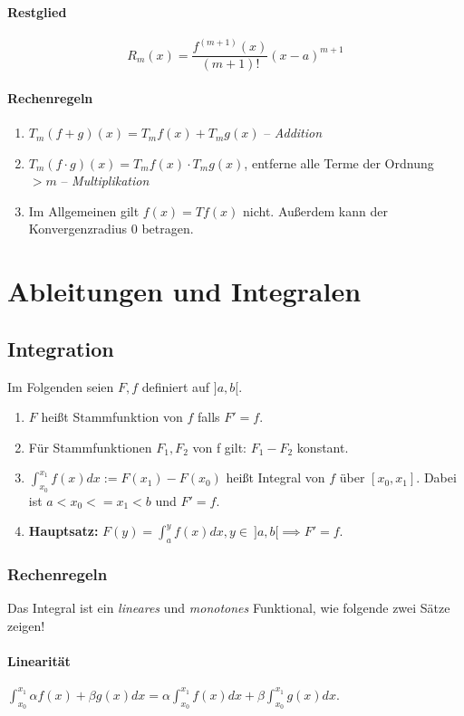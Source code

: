 \documentclass[a4paper, 9pt, DIV=24]{scrartcl}
\begin{document}
\paragraph{Restglied}

\[ R_{m}(x) = \frac{f^{(m+1)}(x)}{(m+1)!}(x-a)^{m+1} \]

\paragraph{Rechenregeln}
\begin{enumerate}[label={(}\arabic*{)}]
 \item $T_m(f+g)(x) = T_m f(x) + T_m g(x)$ -- \emph{Addition}
 \item $T_m(f\cdot g)(x) = T_m f(x) \cdot T_m g(x)$, entferne alle Terme der Ordnung $> m$ -- \emph{Multiplikation}
 \item Im Allgemeinen gilt $f(x) = T f(x)$ nicht. Außerdem kann der Konvergenzradius $0$ betragen.
\end{enumerate}

\clearpage
\section{Ableitungen und Integralen}

\subsection{Integration}
Im Folgenden seien $F, f$ definiert auf $]a,b[$.
\begin{enumerate}[label={(}\arabic*{)}]
 \item $F$ heißt Stammfunktion von $f$ falls $F' = f$.
 \item Für Stammfunktionen $F_1, F_2$ von f gilt: $F_1 - F_2$ konstant.
 \item $\int_{x_0}^{x_1}f(x)dx := F(x_1) - F(x_0)$ heißt Integral von $f$ über $[x_0, x_1]$.
   Dabei ist $a < x_0 <= x_1 < b$ und $F' = f$.
 \item \textbf{Hauptsatz:} $F(y) = \int_{a}^{y}f(x)dx, y \in\ ]a,b[ \implies F' = f.$
\end{enumerate}

\subsubsection{Rechenregeln}
Das Integral ist ein \emph{lineares} und \emph{monotones} Funktional, wie folgende zwei Sätze zeigen!
\paragraph{Linearität}
$\int_{x_0}^{x_1}\alpha f(x) + \beta g(x) dx = \alpha\int_{x_0}^{x_1}f(x)dx + \beta\int_{x_0}^{x_1}g(x)dx.$
\end{document}
